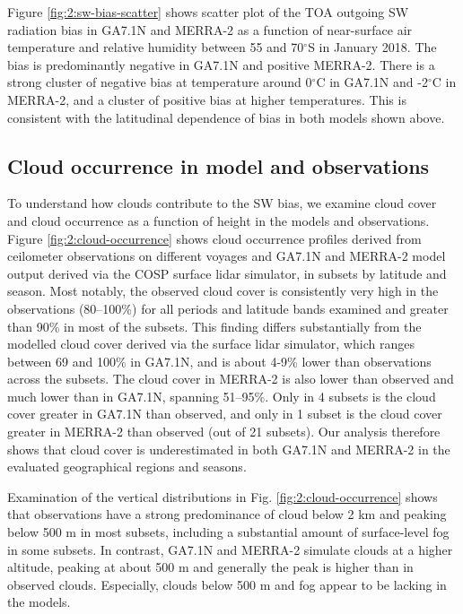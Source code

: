 Figure \ref{fig:2:sw-bias-scatter} shows scatter plot of the TOA outgoing SW
radiation bias in GA7.1N and MERRA-2 as a function of near-surface air
temperature and relative humidity between 55 and 70$^\circ$S in January
2018. The bias is predominantly negative in GA7.1N and positive MERRA-2. There
is a strong cluster of negative bias at temperature around 0$^\circ$C in
GA7.1N and -2$^\circ$C in MERRA-2, and a cluster of positive bias at higher
temperatures. This is consistent with the latitudinal dependence of bias in
both models shown above.

\subsection{Cloud occurrence in model and observations}
\label{sec:2:cloud-occurrence}

To understand how clouds contribute to the SW bias, we examine cloud cover and
cloud occurrence as a function of height in the models and observations. Figure
\ref{fig:2:cloud-occurrence} shows cloud occurrence profiles derived from
ceilometer observations on different voyages and GA7.1N and MERRA-2 model
output derived via the COSP surface lidar simulator, in subsets by latitude and
season. Most notably, the observed cloud cover is consistently very high in the
observations (80--100\%) for all periods and latitude bands examined and
greater than 90\% in most of the subsets. This finding differs substantially
from the modelled cloud cover derived via the surface lidar simulator, which
ranges between 69 and 100\% in GA7.1N, and is about 4-9\% lower than
observations across the subsets. The cloud cover in MERRA-2 is also lower than
observed and much lower than in GA7.1N, spanning 51--95\%. Only in 4 subsets is
the cloud cover greater in GA7.1N than observed, and only in 1 subset is the
cloud cover greater in MERRA-2 than observed (out of 21 subsets).  Our analysis
therefore shows that cloud cover is underestimated in both GA7.1N and MERRA-2
in the evaluated geographical regions and seasons.

Examination of the vertical distributions in Fig. \ref{fig:2:cloud-occurrence}
shows that observations have a strong predominance of cloud below 2 \unit{km}
and peaking below 500 m in most subsets, including a substantial amount
of surface-level fog in some subsets. In contrast, GA7.1N and MERRA-2 simulate
clouds at a higher altitude, peaking at about 500 \unit{m} and generally the
peak is higher than in observed clouds. Especially, clouds below 500 m and fog
appear to be lacking in the models.

